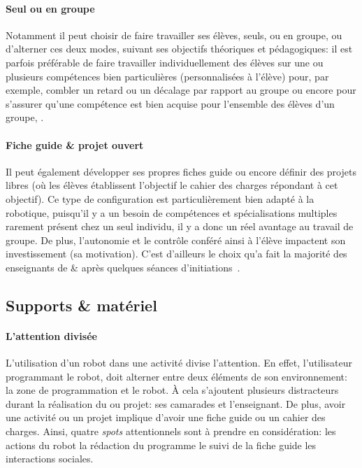         \paragraph{Seul ou en groupe}
            Notamment il peut choisir de faire travailler ses élèves, seuls, ou en groupe, ou d'alterner ces deux modes, suivant ses objectifs théoriques et pédagogiques: il est parfois préférable de faire travailler individuellement des élèves sur une ou plusieurs compétences bien particulières (personnalisées à l'élève) pour, par exemple, combler un retard ou un décalage par rapport au groupe ou encore pour s'assurer qu'une compétence est bien acquise pour l'ensemble des élèves d'un groupe, \etc. 
        \paragraph{Fiche guide \& projet ouvert}
            Il peut également développer ses propres fiches guide ou encore définir des projets libres (\eg où les élèves établissent l'objectif \etou le cahier des charges répondant à cet objectif). Ce type de configuration est particulièrement bien adapté à la robotique, puisqu'il y a un besoin de compétences et spécialisations multiples rarement présent chez un seul individu, il y a donc un réel avantage au travail de groupe. De plus, l'autonomie et le contrôle conféré ainsi à l'élève impactent son investissement (sa motivation). C'est d'ailleurs le choix qu'a fait la majorité des enseignants de  \&  après quelques séances d'initiations~.
    \subsection{Supports \& matériel}\label{sec:support}
        \paragraph{L'attention divisée}
            L'utilisation d'un robot dans une activité divise l'attention. En effet, l'utilisateur programmant le robot, doit alterner entre deux éléments de son environnement: la zone de programmation et le robot. À cela s'ajoutent plusieurs distracteurs durant la réalisation du  ou projet: ses camarades et l'enseignant. De plus, avoir une activité ou un projet implique d'avoir une fiche guide ou un cahier des charges. Ainsi, quatre \textit{spots} attentionnels sont à prendre en considération: \Li les actions du robot \ii la rédaction du programme \iii le suivi de la fiche guide \iiii les interactions sociales. 
